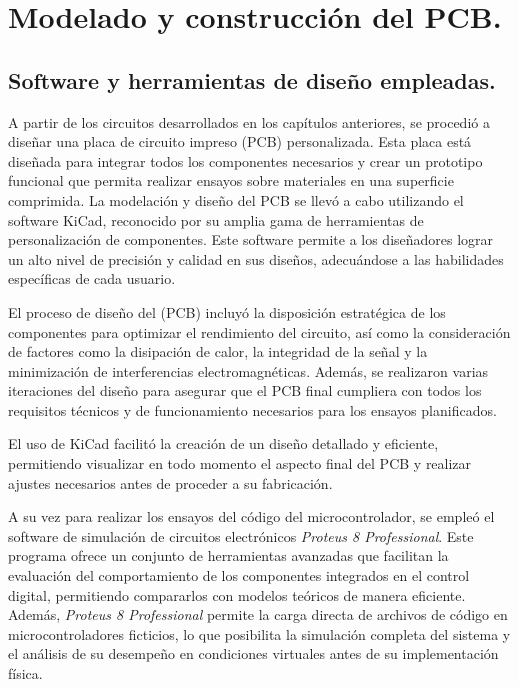 \chapter{Modelado y construcción del PCB.}

\label{C:EModelado y construcción del PCB.}

\section{Software y herramientas de diseño empleadas.}

A partir de los circuitos desarrollados en los capítulos anteriores, se procedió a diseñar una placa de circuito impreso (PCB) personalizada. Esta placa está diseñada para integrar todos los componentes necesarios y crear un prototipo funcional que permita realizar ensayos sobre materiales en una superficie comprimida. La modelación y diseño del PCB se llevó a cabo utilizando el software KiCad, reconocido por su amplia gama de herramientas de personalización de componentes. Este software permite a los diseñadores lograr un alto nivel de precisión y calidad en sus diseños, adecuándose a las habilidades específicas de cada usuario.\cite{kicad} \par 
El proceso de diseño del (PCB) incluyó la disposición estratégica de los componentes para optimizar el rendimiento del circuito, así como la consideración de factores como la disipación de calor, la integridad de la señal y la minimización de interferencias electromagnéticas. Además, se realizaron varias iteraciones del diseño para asegurar que el PCB final cumpliera con todos los requisitos técnicos y de funcionamiento necesarios para los ensayos planificados. \par 
El uso de KiCad facilitó la creación de un diseño detallado y eficiente, permitiendo visualizar en todo momento el aspecto final del PCB y realizar ajustes necesarios antes de proceder a su fabricación.\par
A su vez para realizar los ensayos del código del microcontrolador, se empleó el software de simulación de circuitos electrónicos \textit{Proteus 8 Professional}. Este programa ofrece un conjunto de herramientas avanzadas que facilitan la evaluación del comportamiento de los componentes integrados en el control digital, permitiendo compararlos con modelos teóricos de manera eficiente. Además, \textit{Proteus 8 Professional} permite la carga directa de archivos de código en microcontroladores ficticios, lo que posibilita la simulación completa del sistema y el análisis de su desempeño en condiciones virtuales antes de su implementación física.


